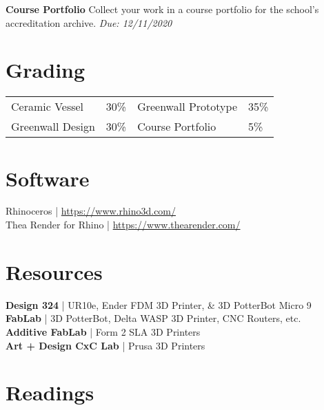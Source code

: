 \documentclass[11pt,article,oneside]{memoir}
\begin{document}
\noindent \textbf{Course Portfolio}
Collect your work in a course portfolio 
for the school's accreditation archive.
\emph{Due: 12/11/2020}\\

\section{Grading}
%
\begin{table}[H]
\begin{tabular}{l r @{\hskip 2cm} l @{\hskip 0.5cm} l}
%
Ceramic Vessel & 30\% & Greenwall Prototype & 35\% \\
Greenwall Design & 30\% & Course Portfolio & 5\% \\
%
\end{tabular}
\end{table}

\section{Software}
Rhinoceros | \url{https://www.rhino3d.com/}\\
Thea Render for Rhino | \url{https://www.thearender.com/}\\


\section{Resources}
\textbf{Design 324} | UR10e, Ender FDM 3D Printer, \& 3D PotterBot Micro 9\\
\textbf{FabLab} | 3D PotterBot, Delta WASP 3D Printer, CNC Routers, etc.\\
\textbf{Additive FabLab} | Form 2 SLA 3D Printers\\
\textbf{Art + Design CxC Lab} | Prusa 3D Printers\\


\section{Readings}
\vspace*{0.5cm}
\nocite{*}
\setlength{}
\printbibliography[heading=none]
\end{document}
